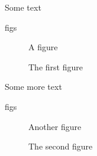 \documentclass{article}
\begin{document}
Some text
\begin{writeverbatim}{figs}
\begin{figure}
A figure
\caption{The first figure}
\end{figure}
\end{writeverbatim}
Some more text
\begin{writeverbatim}{figs}
\begin{figure}
Another figure
\caption{The second figure}
\end{figure}
\end{writeverbatim}

\end{document}
